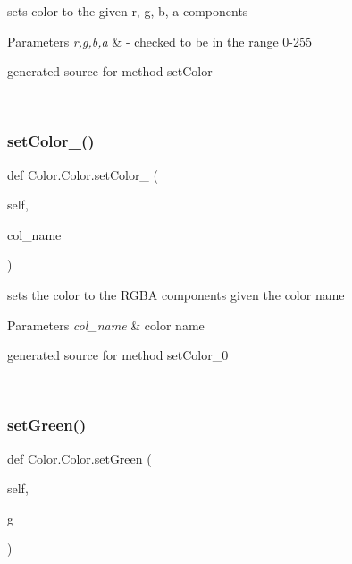 sets color to the given r, g, b, a components 


\begin{DoxyParams}{Parameters}
{\em r,g,b,a} & -\/ checked to be in the range 0-\/255\begin{DoxyVerb}generated source for method setColor \end{DoxyVerb}
 \\
\hline
\end{DoxyParams}
\hypertarget{class_color_1_1_color_ab17d74d2318751b06e1fc9688f7ee273}{}\label{class_color_1_1_color_ab17d74d2318751b06e1fc9688f7ee273} 
\subsubsection{\texorpdfstring{set\+Color\+\_()}{setColor\_0()}}
{\footnotesize\ttfamily def Color.\+Color.\+set\+Color\+\_ (\begin{DoxyParamCaption}\item[{}]{self,  }\item[{}]{col\+\_\+name }\end{DoxyParamCaption})}



sets the color to the R\+G\+BA components given the color name 


\begin{DoxyParams}{Parameters}
{\em col\+\_\+name} & color name\begin{DoxyVerb}generated source for method setColor_0 \end{DoxyVerb}
 \\
\hline
\end{DoxyParams}
\hypertarget{class_color_1_1_color_a3ea676f0ace46e02292527acc7915d0b}{}\label{class_color_1_1_color_a3ea676f0ace46e02292527acc7915d0b} 
\subsubsection{\texorpdfstring{set\+Green()}{setGreen()}}
{\footnotesize\ttfamily def Color.\+Color.\+set\+Green (\begin{DoxyParamCaption}\item[{}]{self,  }\item[{}]{g }\end{DoxyParamCaption})}



